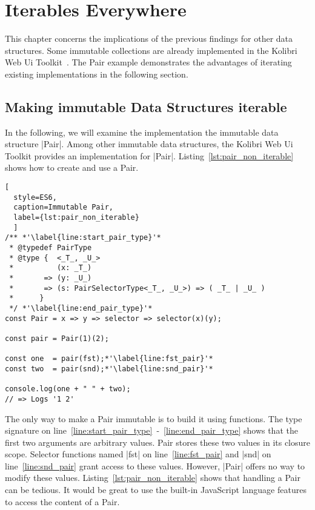 \section{Iterables Everywhere}
\label{sec:Iterables Everywhere}
This chapter concerns the implications of the previous findings for other
data structures.
Some immutable collections are already implemented in the Kolibri Web Ui
Toolkit~\cite{kolibri}. The Pair example demonstrates the advantages of 
iterating existing implementations in the following section.

\subsection{Making immutable Data Structures iterable}
\label{sub:Making immutable Data Structures iterable}
In the following, we will examine the implementation the immutable data structure |Pair|. 
Among other immutable data structures, the Kolibri Web Ui Toolkit provides an
implementation for |Pair|. 
Listing~\ref{lst:pair_non_iterable} shows how to create and use a Pair.

\begin{lstlisting}[
  style=ES6, 
  caption=Immutable Pair,
  label={lst:pair_non_iterable}
  ]
/** *'\label{line:start_pair_type}'*
 * @typedef PairType
 * @type {  <_T_, _U_>
 *          (x: _T_)
 *       => (y: _U_)
 *       => (s: PairSelectorType<_T_, _U_>) => ( _T_ | _U_ ) 
 *      }
 */ *'\label{line:end_pair_type}'*
const Pair = x => y => selector => selector(x)(y);

const pair = Pair(1)(2);

const one  = pair(fst);*'\label{line:fst_pair}'*
const two  = pair(snd);*'\label{line:snd_pair}'*

console.log(one + " " + two);
// => Logs '1 2'
\end{lstlisting}

The only way to make a Pair immutable is to build it using functions. The type 
signature on line~\ref{line:start_pair_type}~-~\ref{line:end_pair_type} shows 
that the first two arguments are arbitrary values. Pair stores these two values
in its closure scope. 
Selector functions named |fst| on line~\ref{line:fst_pair} and |snd| on 
line~\ref{line:snd_pair} grant access to these values. However, |Pair| offers
no way to modify these values. Listing~\ref{lst:pair_non_iterable} shows that handling a Pair can be tedious. 
It would be great to use the built-in JavaScript language features to access 
the content of a Pair. 

